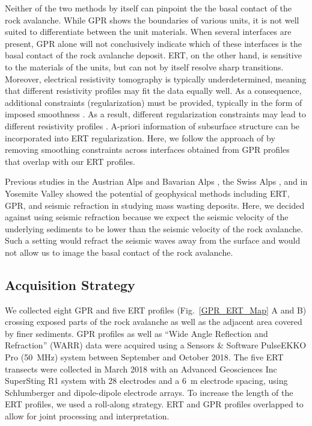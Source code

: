 \documentclass[utf8]{frontiersSCNS}
\begin{document}
Neither of the two methods by itself can pinpoint the the basal contact of the rock avalanche. While GPR shows the boundaries of various units, it is not well suited to differentiate between the unit materials. When several interfaces are present, GPR alone will not conclusively indicate which of these interfaces is the basal contact of the rock avalanche deposit. ERT, on the other hand, is sensitive to the materials of the units, but can not by itself resolve sharp transitions. Moreover, electrical resistivity tomography is typically underdetermined, meaning that different resistivity profiles may fit the data equally well. As a consequence, additional constraints (regularization) must be provided, typically in the form of imposed smoothness \citep[e.g.][]{gunther2006three, loke2013recent}. As a result, different regularization constraints may lead to different resistivity profiles \citep{oldenburg1999estimating}. A-priori information of subsurface structure can be incorporated into ERT regularization. Here, we follow the approach of \cite{doetsch2012constraining} by removing smoothing constraints across interfaces obtained from GPR profiles that overlap with our ERT profiles.

Previous studies in the Austrian Alps and Bavarian Alps \citep{sass2006determination, sass2001investigations}, the Swiss Alps \citep{otto2006comparing, socco2010geophysical}, and in Yosemite Valley \citep{brody2015near, Liu2018nearAGU} showed the potential of geophysical methods including ERT, GPR, and seismic refraction in studying mass wasting deposits. Here, we decided against using seismic refraction because we expect the seismic velocity of the underlying sediments to be lower than the seismic velocity of the rock avalanche. Such a setting would refract the seismic waves away from the surface and would not allow us to image the basal contact of the rock avalanche.


\subsection{Acquisition Strategy}



We collected eight GPR and five ERT profiles (Fig.~\ref{GPR_ERT_Map} A and B) crossing exposed parts of the rock avalanche as well as the adjacent area covered by finer sediments. GPR profiles as well as ``Wide Angle Reflection and Refraction'' (WARR) data were acquired using a Sensors \& Software PulseEKKO Pro (\SI{50}{\mega Hz}) system between September and October 2018. The five ERT transects were collected in March 2018 with an Advanced Geosciences Inc SuperSting R1 system with 28 electrodes and a \SI{6}{m} electrode spacing, using Schlumberger and dipole-dipole electrode arrays. To increase the length of the ERT profiles, we used a roll-along strategy. ERT and GPR profiles overlapped to allow for joint processing and interpretation. 
\end{document}
